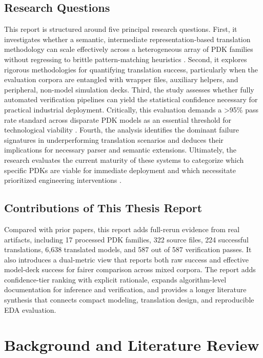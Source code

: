 \documentclass[12pt,a4paper,oneside]{report}
\begin{document}
\section{Research Questions}
This report is structured around five principal research questions. First, it investigates whether a semantic, intermediate representation-based translation methodology can scale effectively across a heterogeneous array of PDK families without regressing to brittle pattern-matching heuristics \cite{edacurry,cad_flow_survey}. Second, it explores rigorous methodologies for quantifying translation success, particularly when the evaluation corpora are entangled with wrapper files, auxiliary helpers, and peripheral, non-model simulation decks. Third, the study assesses whether fully automated verification pipelines can yield the statistical confidence necessary for practical industrial deployment. Critically, this evaluation demands a >95\% pass rate standard across disparate PDK models as an essential threshold for technological viability \cite{autospice}. Fourth, the analysis identifies the dominant failure signatures in underperforming translation scenarios and deduces their implications for necessary parser and semantic extensions. Ultimately, the research evaluates the current maturity of these systems to categorize which specific PDKs are viable for immediate deployment and which necessitate prioritized engineering interventions \cite{eda_standards,translation_limits}.

\section{Contributions of This Thesis Report}
Compared with prior papers, this report adds full-rerun evidence from real artifacts, including 17 processed PDK families, 322 source files, 224 successful translations, 6,638 translated models, and 587 out of 587 verification passes. It also introduces a dual-metric view that reports both raw success and effective model-deck success for fairer comparison across mixed corpora. The report adds confidence-tier ranking with explicit rationale, expands algorithm-level documentation for inference and verification, and provides a longer literature synthesis that connects compact modeling, translation design, and reproducible EDA evaluation.

\chapter{Background and Literature Review}
\end{document}

